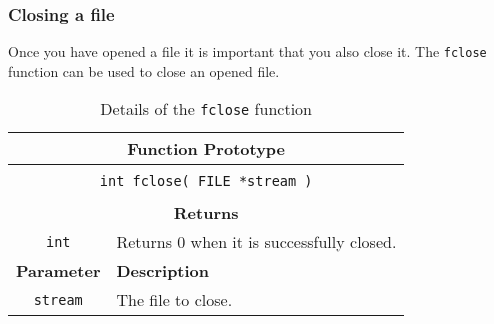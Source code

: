 

\clearpage
\subsubsection{Closing a file} %
\label{ssub:closing_a_file}

Once you have opened a file it is important that you also close it. The \texttt{fclose} function can be used to close an opened file.

\begin{table}[h]
  \centering
  \begin{tabular}{|c|p{9.5cm}|}
    \hline
    \multicolumn{2}{|c|}{\textbf{Function Prototype}} \\
    \hline
    \multicolumn{2}{|c|}{} \\
    \multicolumn{2}{|c|}{\texttt{int fclose( FILE *stream )}} \\
    \multicolumn{2}{|c|}{} \\
    \hline
    \multicolumn{2}{|c|}{\textbf{Returns}} \\
    \hline
    \texttt{int} & Returns 0 when it is successfully closed. \\
    \hline
    \textbf{Parameter} & \textbf{Description} \\
    \hline
    \texttt{ stream } & The file to close. \\
    \hline
  \end{tabular}
  \caption{Details of the \texttt{fclose} function}
  \label{tbl:fclose}
\end{table}


